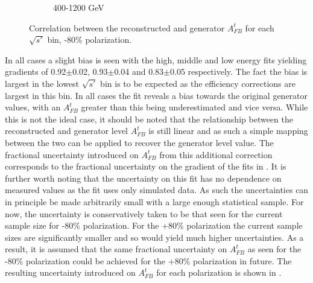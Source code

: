 \begin{figure}
\begin{subfigure}{.6\textwidth}
    \caption{400-1200 GeV}
  \end{subfigure}
  \caption{Correlation between the reconstructed and generator $A_{FB}^t$ for each $\sqrt{s'}$ bin, -80\% polarization.}
  \label{fig:biassys}
\end{figure}

In all cases a slight bias is seen with the high, middle and low energy fits yielding gradients of 0.92$\pm$0.02, 0.93$\pm$0.04 and 0.83$\pm$0.05 respectively. The fact the bias is largest in the lowest $\sqrt{s'}$ bin is to be expected as the efficiency corrections are largest in this bin. In all cases the fit reveals a bias towards the original generator values, with an $A_{FB}^t$ greater than this being underestimated and vice versa. While this is not the ideal case, it should be noted that the relationship between the reconstructed and generator level $A_{FB}^t$ is still linear and as such a simple mapping between the two can be applied to recover the generator level value. The fractional uncertainty introduced on $A_{FB}^t$ from this additional correction corresponds to the fractional uncertainty on the gradient of the fits in . It is further worth noting that the uncertainty on this fit has no dependence on measured values as the fit uses only simulated data. As such the uncertainties can in principle be made arbitrarily small with a large enough statistical sample. For now, the uncertainty is conservatively taken to be that seen for the current sample size for -80\% polarization. For the +80\% polarization the current sample sizes are significantly smaller and so would yield much higher uncertainties. As a result, it is assumed that the same fractional uncertainty on $A_{FB}^t$ as seen for the -80\% polarization could be achieved for the +80\% polarization in future. The resulting uncertainty introduced on $A_{FB}^t$ for each polarization is shown in .

